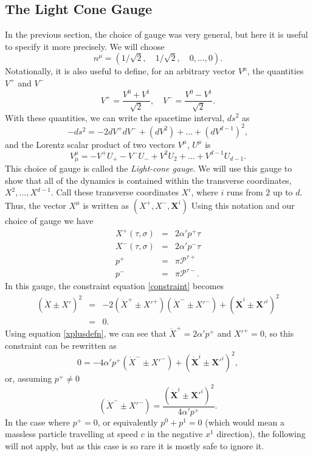 \documentclass[a4paper,12pt]{article}
\numberwithin{equation}{section}
\begin{document}
\subsection{The Light Cone Gauge}
In the previous section, the choice of gauge was very general, but here it is useful to specify it more precisely. We will choose 
\begin{equation}
n^\mu = (1/\sqrt{2},\quad 1/\sqrt{2},\quad 0, \dots, 0).
\end{equation}
Notationally, it is also useful to define, for an arbitrary vector $V^\mu$, the quantities $V^+$ and $V^-$ 
\begin{equation}
V^+ = \frac{V^0 + V^1}{\sqrt{2}}, \quad V^- = \frac{V^0 - V^1}{\sqrt{2}}. 
\end{equation}
With these quantities, we can write the spacetime interval, $ds^2$ as
\begin{equation}
-ds^2 = -2dV^+dV^- + (dV^2) + \dots + (dV^{d-1})^2,
\end{equation}
and the Lorentz scalar product of two vectors $V^\mu$, $U^\mu$ is 
\begin{equation}
V^\mu_\mu = -V^+ U_+ - V^-U_- + V^2U_2 + \dots + V^{d-1}U_{d-1}. 
\end{equation}
This choice of gauge is called the \emph{Light-cone gauge}. We will use this gauge to show that all of the dynamics is contained within the transverse coordinates, $X^2, \dots, X^{d-1}$. Call these transverse coordinates $X^i$, where $i$ runs from $2$ up to $d$. Thus, the vector $X^\mu$ is written as $(X^+, X^-, \mathbf{X}^i)$  
Using this notation and our choice of gauge we have 
\begin{eqnarray}
X^+(\tau, \sigma) &=& 2\alpha' p^+ \tau\label{xplusdefn} \\
X^-(\tau, \sigma) &=& 2\alpha' p^- \tau \\
p^+ & = & \pi \mathcal{P}^{\tau +}\\
p^- & = & \pi \mathcal{P}^{\tau -}. 
\end{eqnarray} 
In this gauge, the constraint equation \ref{constraint} becomes
\begin{eqnarray*}
(\dot{X} \pm X')^2& =&
-2(\dot{X}^+ \pm X'^+)(\dot{X}^- \pm X'^-) + (\dot{\mathbf{X}}^i \pm \mathbf{X}'^i)^2\\ & = & 0 .
\end{eqnarray*}
Using equation \ref{xplusdefn}, we can see that $\dot{X}^+ = 2\alpha'p^+$ and $X'^+=0$, so this constraint can be rewritten as
\begin{equation}
0 = -4\alpha'p^+(\dot{X}^- \pm X'^-) +  (\dot{\mathbf{X}}^i \pm \mathbf{X}'^i)^2,
\end{equation}
or, assuming $p^+ \ne 0$
\begin{equation}\label{pmderivatives}
(\dot{X}^- \pm X'^-) = \frac{ (\dot{\mathbf{X}}^i \pm \mathbf{X}'^i)^2}{4\alpha'p^+}.
\end{equation}
In the case where $p^+ = 0$, or equivalently $p^0 + p^1 = 0$ (which would mean a massless particle travelling at speed $c$ in the negative $x^1$ direction), the following will not apply, but as this case is so rare it is mostly safe to ignore it.
\end{document}

